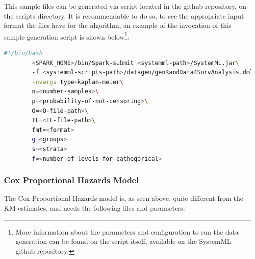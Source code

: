 \documentclass[11pt]{book} %
\begin{document}
      This sample files can be generated via script located in the github repository, on the scripts directory. It is recommendable to do so, to see the appropriate input format the files have for the algorithm, an example of the invocation of this sample generation script is shown below\footnote{More information about the parameters and configuration to run the data generation can be found on the script itself, available on the SystemML github repository.}:

      \begin{lstlisting}[label=data-generation-invocation, language=sh, caption=Sample invocation of the data generation script]
        #!/bin/bash
        <SPARK_HOME>/bin/Spark-submit <systemml-path>/SystemML.jar\
        -f <systemml-scripts-path>/datagen/genRandData4SurvAnalysis.dml\
        -nvargs type=kaplan-meier\
        n=<number-samples>\
        p=<probability-of-not-censoring>\
        O=<O-file-path>\
        TE=<TE-file-path>\
        fmt=<format>
        g=<groups>
        s=<strata>
        f=<number-of-levels-for-cathegorical>
      \end{lstlisting}

\newpage

    \subsubsection{Cox Proportional Hazards Model}

      The Cox Proportional Hazards model is, as seen above, quite different from the KM estimates, and needs the following files and parameters:
\end{document}
